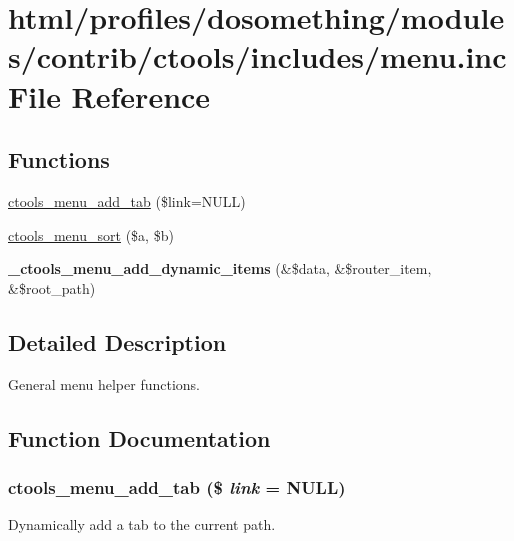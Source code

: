 \hypertarget{profiles_2dosomething_2modules_2contrib_2ctools_2includes_2menu_8inc}{
\section{html/profiles/dosomething/modules/contrib/ctools/includes/menu.inc File Reference}
\label{profiles_2dosomething_2modules_2contrib_2ctools_2includes_2menu_8inc}
}
\subsection*{Functions}
\begin{DoxyCompactItemize}
\item 
\hyperlink{profiles_2dosomething_2modules_2contrib_2ctools_2includes_2menu_8inc_abe055cbfacd9bdd8c0ecb45bfa2bf304}{ctools\_\-menu\_\-add\_\-tab} (\$link=NULL)
\item 
\hyperlink{profiles_2dosomething_2modules_2contrib_2ctools_2includes_2menu_8inc_a4175eeb345ac720cbe0f27042cce1fa6}{ctools\_\-menu\_\-sort} (\$a, \$b)
\item 
\hypertarget{profiles_2dosomething_2modules_2contrib_2ctools_2includes_2menu_8inc_a5541c20154547ef71f8eb3dfcc1cc564}{
{\bfseries \_\-ctools\_\-menu\_\-add\_\-dynamic\_\-items} (\&\$data, \&\$router\_\-item, \&\$root\_\-path)}
\label{profiles_2dosomething_2modules_2contrib_2ctools_2includes_2menu_8inc_a5541c20154547ef71f8eb3dfcc1cc564}

\end{DoxyCompactItemize}


\subsection{Detailed Description}
General menu helper functions. 

\subsection{Function Documentation}
\hypertarget{profiles_2dosomething_2modules_2contrib_2ctools_2includes_2menu_8inc_abe055cbfacd9bdd8c0ecb45bfa2bf304}{
\subsubsection[{ctools\_\-menu\_\-add\_\-tab}]{\setlength{\rightskip}{0pt plus 5cm}ctools\_\-menu\_\-add\_\-tab (\$ {\em link} = {\ttfamily NULL})}}
\label{profiles_2dosomething_2modules_2contrib_2ctools_2includes_2menu_8inc_abe055cbfacd9bdd8c0ecb45bfa2bf304}
Dynamically add a tab to the current path.

